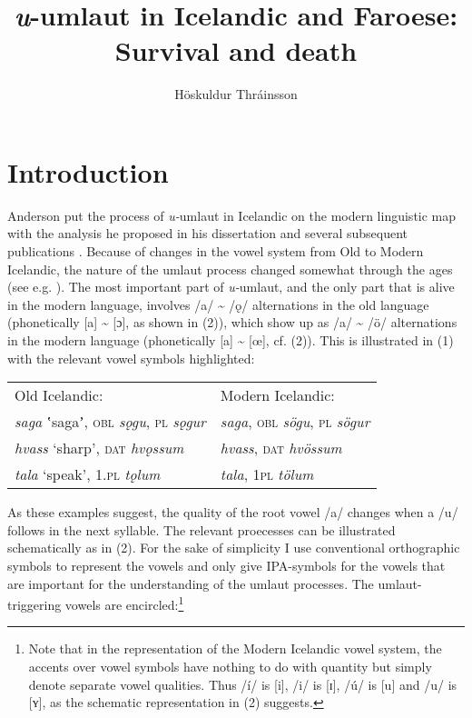 \documentclass[output=paper,
modfonts
]{LSP/langsci}
\title{\emph{u}-umlaut in Icelandic and Faroese: Survival and death}
\author{%
Höskuldur Thráinsson\affiliation{University of Iceland}
}
\begin{document}
\maketitle

\section{Introduction}\label{introduction}

Anderson put the process of \emph{u-}umlaut in Icelandic on the modern linguistic map with the analysis he proposed in his dissertation \citep{Anderson1969} and several subsequent publications \citep{anderson1969b,anderson1972t,anderson1973,anderson1974,anderson1976t}. Because of changes in the vowel system from Old to Modern
Icelandic, the nature of the umlaut process changed somewhat through the ages (see e.g. \citealt{benediktsson1959}). The most important part of \emph{u-}umlaut, and the only part that is alive in the modern language, involves /a/ \textasciitilde{} /ǫ/ alternations in the old language (phonetically {[}a{]} \textasciitilde{} {[}ɔ{]}, as shown in (2)), which show up as /a/ \textasciitilde{} /ö/ alternations in the modern language (phonetically {[}a{]} \textasciitilde{} {[}œ{]}, cf. (2)). This is illustrated in (1) with the relevant vowel symbols highlighted:

\ea
\begin{tabular}[t]{ l l }
Old Icelandic: & Modern Icelandic: \\
\emph{saga} ʽsagaʼ, \textsc{obl} \emph{sǫgu}, \textsc{pl} \emph{sǫgur} & \emph{saga}, \textsc{obl} \emph{sögu}, \textsc{pl} \emph{sögur}\\

\emph{hvass} `sharp', \textsc{dat} \emph{hvǫssum} & \emph{hvass}, \textsc{dat} \emph{hvössum}\\

\emph{tala} `speak', \textsc{1.pl} \emph{tǫlum} & \emph{tala}, \textsc{1pl} \emph{tölum}\\
\end{tabular}
\z

\noindent As these examples suggest, the quality of the root vowel /a/ changes when a /u/ follows in the next syllable. The relevant proecesses can be illustrated schematically as in (2). For the sake of simplicity I use conventional orthographic symbols to represent the vowels and only give IPA-symbols for the vowels that are important for the understanding of the umlaut processes. The umlaut-triggering vowels are encircled:\footnote{Note that in the representation of the Modern Icelandic vowel system, the accents over vowel symbols have nothing to do with quantity but simply denote separate vowel
qualities. Thus /í/ is {[}i{]}, /i/ is {[}ɪ{]}, /ú/ is {[}u{]} and /u/ is {[}ʏ{]}, as the schematic representation in (2) suggests.}
\end{document}
